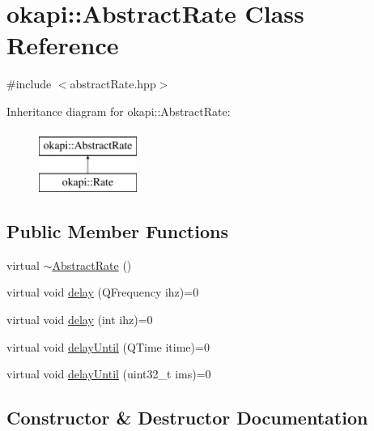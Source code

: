 \hypertarget{classokapi_1_1AbstractRate}{}\section{okapi\+::Abstract\+Rate Class Reference}
\label{classokapi_1_1AbstractRate}


{\ttfamily \#include $<$abstract\+Rate.\+hpp$>$}

Inheritance diagram for okapi\+::Abstract\+Rate\+:\begin{figure}[H]
\begin{center}
\leavevmode
\includegraphics[height=2.000000cm]{classokapi_1_1AbstractRate}
\end{center}
\end{figure}
\subsection*{Public Member Functions}
\begin{DoxyCompactItemize}
\item 
virtual \mbox{\hyperlink{classokapi_1_1AbstractRate_ab2d9563d840f0378325712480a3e572c}{$\sim$\+Abstract\+Rate}} ()
\item 
virtual void \mbox{\hyperlink{classokapi_1_1AbstractRate_ab1abf71d6cf3184abeed1d3556d39d4f}{delay}} (Q\+Frequency ihz)=0
\item 
virtual void \mbox{\hyperlink{classokapi_1_1AbstractRate_a89a4325d3fc4739abc085813095d659a}{delay}} (int ihz)=0
\item 
virtual void \mbox{\hyperlink{classokapi_1_1AbstractRate_a53a15074ca3bd0787ce34d30c068d9b2}{delay\+Until}} (Q\+Time itime)=0
\item 
virtual void \mbox{\hyperlink{classokapi_1_1AbstractRate_a3faf54ea2951ae5e0567cd50ddba0227}{delay\+Until}} (uint32\+\_\+t ims)=0
\end{DoxyCompactItemize}


\subsection{Constructor \& Destructor Documentation}
\mbox{\label{classokapi_1_1AbstractRate_ab2d9563d840f0378325712480a3e572c}} 
